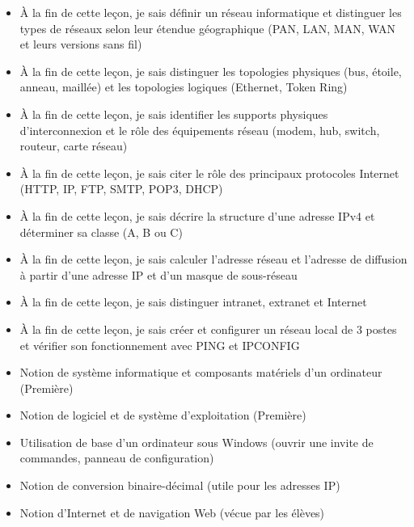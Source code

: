 \documentclass[11pt]{article}
\begin{document}
\begin{objectifs}
\begin{itemize}
\item À la fin de cette leçon, je sais définir un réseau informatique et distinguer les types de réseaux selon leur étendue géographique (PAN, LAN, MAN, WAN et leurs versions sans fil)
\item À la fin de cette leçon, je sais distinguer les topologies physiques (bus, étoile, anneau, maillée) et les topologies logiques (Ethernet, Token Ring)
\item À la fin de cette leçon, je sais identifier les supports physiques d'interconnexion et le rôle des équipements réseau (modem, hub, switch, routeur, carte réseau)
\item À la fin de cette leçon, je sais citer le rôle des principaux protocoles Internet (HTTP, IP, FTP, SMTP, POP3, DHCP)
\item À la fin de cette leçon, je sais décrire la structure d'une adresse IPv4 et déterminer sa classe (A, B ou C)
\item À la fin de cette leçon, je sais calculer l'adresse réseau et l'adresse de diffusion à partir d'une adresse IP et d'un masque de sous-réseau
\item À la fin de cette leçon, je sais distinguer intranet, extranet et Internet
\item À la fin de cette leçon, je sais créer et configurer un réseau local de 3 postes et vérifier son fonctionnement avec PING et IPCONFIG
\end{itemize}
\end{objectifs}

\begin{prerequis}
\begin{itemize}
\item Notion de système informatique et composants matériels d'un ordinateur (Première)
\item Notion de logiciel et de système d'exploitation (Première)
\item Utilisation de base d'un ordinateur sous Windows (ouvrir une invite de commandes, panneau de configuration)
\item Notion de conversion binaire-décimal (utile pour les adresses IP)
\item Notion d'Internet et de navigation Web (vécue par les élèves)
\end{itemize}
\end{prerequis}

\newpage
\end{document}
